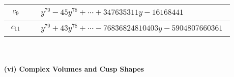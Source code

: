 \documentclass[1p]{elsarticle_modified}
\theoremstyle{definition}
\begin{document}
\begin{tabular}{m{50pt}|m{274pt}}
\hline $$\begin{aligned}c_{9}\end{aligned}$$&$\begin{aligned}
&y^{79}-45 y^{78}+\cdots+347635311 y-16168441
\end{aligned}$\\
\hline $$\begin{aligned}c_{11}\end{aligned}$$&$\begin{aligned}
&y^{79}+43 y^{78}+\cdots-76836824810403 y-5904807660361
\end{aligned}$\\
\hline
\end{tabular}\\~\\
\newpage\flushleft \textbf{(vi) Complex Volumes and Cusp Shapes}
\end{document}
